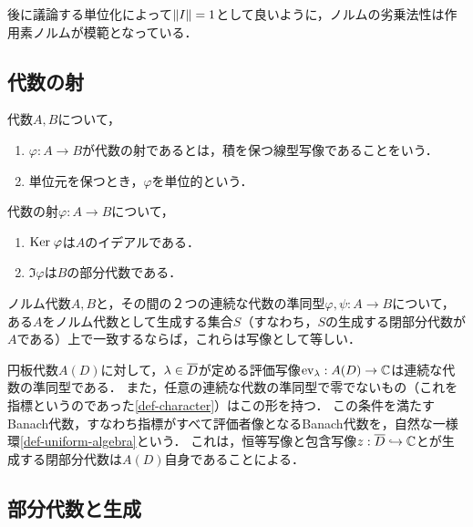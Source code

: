 \documentclass[uplatex,dvipdfmx]{jsreport}
\begin{document}
\begin{remarks}[作用素ノルムの立ち位置]
    後に議論する単位化によって$\|I\|=1$として良いように，ノルムの劣乗法性は作用素ノルムが模範となっている．
\end{remarks}

\subsection{代数の射}

\begin{definition}
    代数$A,B$について，
    \begin{enumerate}
        \item $\varphi:A\to B$が代数の射であるとは，積を保つ線型写像であることをいう．
        \item 単位元を保つとき，$\varphi$を単位的という．
    \end{enumerate}
\end{definition}

\begin{lemma}
    代数の射$\varphi:A\to B$について，
    \begin{enumerate}
        \item $\mathrm{Ker}\;\varphi$は$A$のイデアルである．
        \item $\Im\varphi$は$B$の部分代数である．
    \end{enumerate}
\end{lemma}

\begin{lemma}
    ノルム代数$A,B$と，その間の２つの連続な代数の準同型$\varphi,\psi:A\to B$について，ある$A$をノルム代数として生成する集合$S$（すなわち，$S$の生成する閉部分代数が$A$である）上で一致するならば，これらは写像として等しい．
\end{lemma}

\begin{example}
    円板代数$A(D)$に対して，$\lambda\in\overline{D}$が定める評価写像$\mathrm{ev}_\lambda:A(D)\to\mathbb{C}$は連続な代数の準同型である．
    また，任意の連続な代数の準同型で零でないもの（これを指標というのであった\ref{def-character}）はこの形を持つ．
    この条件を満たすBanach代数，すなわち指標がすべて評価者像となるBanach代数を，自然な一様環\ref{def-uniform-algebra}という．
    これは，恒等写像と包含写像$z:\overline{D}\hookrightarrow\mathbb{C}$とが生成する閉部分代数は$A(D)$自身であることによる．
\end{example}

\subsection{部分代数と生成}
\end{document}
